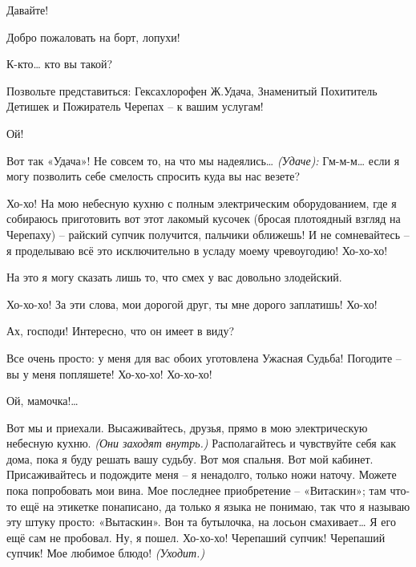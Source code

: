 \documentclass[../main.tex]{subfiles}
\begin{document}
\begin{Dialogue}
 Давайте!


 Добро пожаловать на борт, лопухи!

 К-кто\ldots{} кто вы такой?

 Позвольте представиться: Гексахлорофен Ж.\@ Удача, Знаменитый Похититель Детишек и Пожиратель Черепах \--- к вашим услугам!

 Ой!

 Вот так «Удача»! Не совсем то, на что мы надеялись\ldots{} \emph{(Удаче):} Гм-м-м\ldots{} если я могу позволить себе смелость спросить куда вы нас везете?

 Хо-хо! На мою небесную кухню с полным электрическим оборудованием, где я собираюсь приготовить вот этот лакомый кусочек (бросая плотоядный взгляд на Черепаху) \--- райский супчик получится, пальчики оближешь! И не сомневайтесь \--- я проделываю всё это исключительно в усладу моему чревоугодию! Хо-хо-хо!

 На это я могу сказать лишь то, что смех у вас довольно злодейский.

 Хо-хо-хо! За эти слова, мои дорогой друг, ты мне дорого заплатишь! Хо-хо!

 Ах, господи! Интересно, что он имеет в виду?

 Все очень просто: у меня для вас обоих уготовлена Ужасная Судьба! Погодите \--- вы у меня попляшете! Хо-хо-хо! Хо-хо-хо!

 Ой, мамочка!\ldots{}

 Вот мы и приехали. Высаживайтесь, друзья, прямо в мою электрическую небесную кухню. \emph{(Они заходят внутрь.)} Располагайтесь и чувствуйте себя как дома, пока я буду решать вашу судьбу. Вот моя спальня. Вот мой кабинет. Присаживайтесь и подождите меня \--- я ненадолго, только ножи наточу. Можете пока попробовать мои вина. Мое последнее приобретение \--- «Витаскин»; там что-то ещё на этикетке понаписано, да только я языка не понимаю, так что я называю эту штуку просто: «Вытаскин». Вон та бутылочка, на лосьон смахивает\ldots{} Я его ещё сам не пробовал. Ну, я пошел. Хо-хо-хо! Черепаший супчик! Черепаший супчик! Мое любимое блюдо! \emph{(Уходит.)}


\end{Dialogue}
\end{document}
